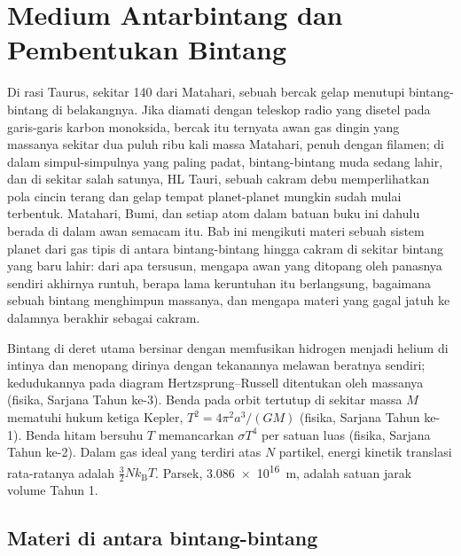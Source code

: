 \chapter{Medium Antarbintang dan Pembentukan Bintang}\label{ch:b2:ism-star-formation}

Di rasi Taurus, sekitar \qty{140}{\parsec} dari Matahari, sebuah bercak gelap
menutupi bintang-bintang di belakangnya. Jika diamati dengan teleskop radio yang
disetel pada garis-garis karbon monoksida, bercak itu ternyata awan gas dingin
yang massanya sekitar dua puluh ribu kali massa Matahari, penuh dengan filamen;
di dalam simpul-simpulnya yang paling padat, bintang-bintang muda sedang lahir,
dan di sekitar salah satunya, HL Tauri, sebuah cakram debu memperlihatkan pola
cincin terang dan gelap tempat planet-planet mungkin sudah mulai terbentuk.
Matahari, Bumi, dan setiap atom dalam batuan buku ini dahulu berada di dalam awan
semacam itu. Bab ini mengikuti materi sebuah sistem planet dari gas tipis di
antara bintang-bintang hingga cakram di sekitar bintang yang baru lahir: dari apa
 tersusun, mengapa awan yang ditopang oleh panasnya sendiri
akhirnya runtuh, berapa lama keruntuhan itu berlangsung, bagaimana sebuah bintang
menghimpun massanya, dan mengapa materi yang gagal jatuh ke dalamnya berakhir
sebagai cakram.

\begin{recall}
Bintang di deret utama bersinar dengan memfusikan hidrogen menjadi helium di
intinya dan menopang dirinya dengan tekanannya melawan beratnya sendiri;
kedudukannya pada diagram Hertzsprung--Russell ditentukan oleh massanya (fisika,
Sarjana Tahun ke-3). Benda pada orbit tertutup di sekitar massa $M$ mematuhi hukum
ketiga Kepler, $T^2 = 4\pi^2 a^3/(GM)$ (fisika, Sarjana Tahun ke-1). Benda hitam
bersuhu $T$ memancarkan $\sigma T^4$ per satuan luas (fisika, Sarjana
Tahun ke-2). Dalam gas ideal yang terdiri atas $N$ partikel, energi kinetik
translasi rata-ratanya adalah $\tfrac32 N k_{\mathrm B} T$. Parsek,
\qty{3.086e16}{m}, adalah satuan jarak volume Tahun 1.
\end{recall}

\section{Materi di antara bintang-bintang}


